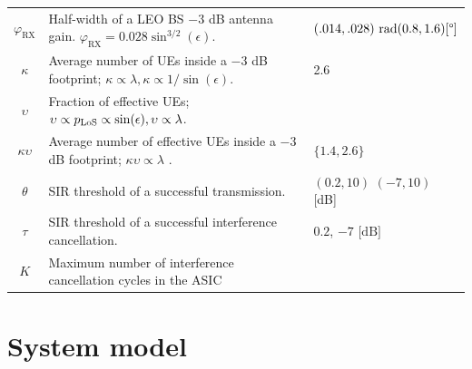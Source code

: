 \documentclass[lettersize,journal]{IEEEtran}
\begin{document}
\begin{table}
\begin{center}
\begin{tabular}{c|p{4.5cm}|p{1.9cm}}
      $\varphi_{\text{RX}}$ & Half-width of a LEO BS $-3$ dB antenna gain. $\varphi_{\text{RX}} = 0.028 \sin^{3/2}(\epsilon).$&$(.014,.028) \text{ rad}\hfill\break (0.8,1.6)[\degree]$ \\      
      $\kappa$& Average number of UEs inside a $-3$ dB footprint; $\kappa \propto \lambda, \kappa \propto 1/\sin(\epsilon)$.& 2.6 \\
      $\upsilon$&Fraction of effective UEs; $\hfill \break\upsilon \propto p_{\text{LoS}} \propto\sin(\epsilon),  \upsilon \propto \lambda$. & \\      
      $\kappa \upsilon$& Average number of effective UEs inside a $-3$ dB footprint; $\kappa \upsilon \propto \lambda $ .& $\{1.4,2.6 \}$ \\
      $\theta$ & SIR threshold of a successful transmission.&$(0.2,10)$  \break \hfill $(-7,10)$ [dB]   \\
      $\tau$ & SIR threshold of a successful interference cancellation.& $0.2$, $-7\text{ [dB]}$\\
      $K$ & Maximum number of interference cancellation cycles in the ASIC\\
      \hline
    \end{tabular}
  \end{center}
\end{table}   


\section{System model}
\end{document}
